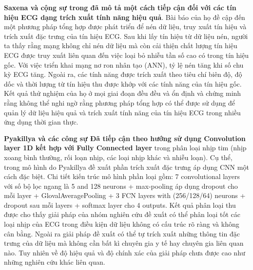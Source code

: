 \textbf{Saxena và cộng sự trong \cite{classify} đã mô tả một cách tiếp cận đối với các tín hiệu ECG dạng trích xuất tính năng hiệu quả}. Bài báo của họ đề cập đến một phương pháp tổng hợp được phát triển để nén dữ liệu, truy xuất tín hiệu và trích xuất đặc trưng của tín hiệu ECG. Sau khi lấy tín hiệu từ dữ liệu nén, người ta thấy rằng mạng không chỉ nén dữ liệu mà còn cải thiện chất lượng tín hiệu ECG được truy xuất liên quan đến việc loại bỏ nhiễu tần số cao có trong tín hiệu gốc. Với việc triển khai mạng nơ ron nhân tạo (ANN), tỷ lệ nén tăng khi số chu kỳ ECG tăng. Ngoài ra, các tính năng được trích xuất theo tiêu chí biên độ, độ dốc và thời lượng từ tín hiệu thu được khớp với các tính năng của tín hiệu gốc. Kết quả thử nghiệm của họ ở mọi giai đoạn đều đều và ổn định và chứng minh rằng không thể nghi ngờ rằng phương pháp tổng hợp có thể được sử dụng để quản lý dữ liệu hiệu quả và trích xuất tính năng của tín hiệu ECG trong nhiều ứng dụng thời gian thực.

\textbf{Pyakillya và các công sự \cite{cnn1d} Đã tiếp cận theo hướng sử dụng Convolution layer 1D kết hợp với Fully Connected layer} trong phân loại nhịp tim (nhịp xoang bình thường, rối loạn nhịp, các loại nhịp khác và nhiễu loạn). Cụ thể, trong mô hình do Pyakillya đề xuất phần trích xuất đặc trưng áp dụng CNN một cách đặc biệt. Chi tiết kiến trúc mô hình phần loại gồm: 7 convolutional layers với số bộ lọc ngang là 5 and 128 neurons + max-pooling áp dụng dropout cho mỗi layer + GlovalAveragePooling + 3 FCN layers with (256/128/64) neurons + dropout sau mỗi layers + softmax layer cho 4 outputs. Kết quả phân loại thu được cho thấy giải pháp của nhóm nghiên cứu đề xuất có thể phân loại tốt các loại nhịp của ECG trong điều kiện dữ liệu không có cấu trúc rõ ràng và không cân bằng. Ngoài ra giải pháp đề xuất có thể tự trích xuất những thông tin đặc trưng của dữ liệu mà không cần bất kì chuyên gia y tế hay chuyên gia liên quan nào. Tuy nhiên về độ hiệu quả và độ chính xác của giải pháp chưa được cao như những nghiên cứu khác liên quan.


